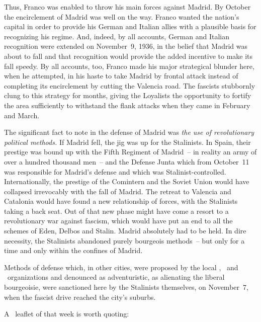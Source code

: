 \indexFFranco{}
Thus, Franco was enabled to throw his main forces against Madrid. By October the encirclement of Madrid was well on the way. Franco wanted the nation’s capital in order to provide his German and Italian allies with a plausible basis for recognizing his regime. And, indeed, by all accounts, German and Italian recognition were extended on November~9, 1936, in the belief that Madrid was about to fall and that recognition would provide the added incentive to make its fall speedy. By all accounts, too, Franco made his major strategical blunder here, when he attempted, in his haste to take Madrid by frontal attack instead of completing its encirclement by cutting the Valencia road. The fascists stubbornly clung to this strategy for months, giving the Loyalists the opportunity to fortify the area sufficiently to withstand the flank attacks when they came in February and March.

The significant fact to note in the defense of Madrid was \emph{the use of revolutionary political methods.} If Madrid fell, the jig was up for the Stalinists. In Spain, their prestige was bound up with the Fifth Regiment of Madrid~-- in reality an army of over a hundred thousand men~-- and the Defense Junta which from October~11 was responsible for Madrid’s defense and which was Stalinist-controlled. Internationally\kn, the prestige of the Comintern and the Soviet Union would have collapsed irrevocably with the fall of Madrid. The retreat to Valencia and Catalonia would have found a new relationship of forces, with the Stalinists taking a back seat. Out of that new phase might have come a resort to a revolutionary war against fascism, which would have put an end to all the schemes of Eden, Delbos and Stalin. Madrid absolutely had to be held. In dire necessity\kn, the Stalinists abandoned purely bourgeois methods~-- but only for a time and only within the confines of Madrid.

\indexCNT{}
Methods of defense which, in other cities, were proposed by the local \POUM\kn, \FAI\ and \CNT\ organizations and denounced as adventuristic, as alienating the liberal bourgeoisie, were sanctioned here by the Stalinists themselves, on November~7\kn, when the fascist drive reached the city’s suburbs.

\medskip

A \CNT\ leaflet of that week is worth quoting:

